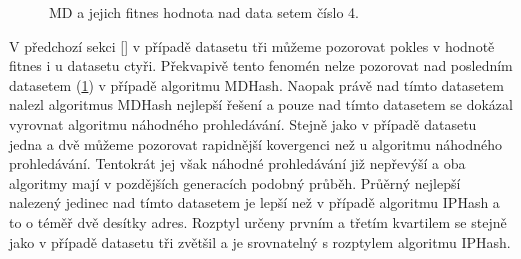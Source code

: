 \begin{figure}[!ht]
	\centering
	\caption{MD a jejich fitnes hodnota nad data setem číslo 4.}
	\label{fig:MDComparison4}
\end{figure}

V předchozí sekci [] v případě datasetu tři můžeme pozorovat pokles v hodnotě fitnes i u datasetu ctyři. Překvapivě
tento fenomén nelze pozorovat nad posledním datasetem (\ref{fig:MDComparison4}) v případě algoritmu MDHash. Naopak právě nad tímto datasetem
nalezl algoritmus MDHash nejlepší řešení a pouze nad tímto datasetem se dokázal vyrovnat algoritmu náhodného prohledávání.
Stejně jako v případě datasetu jedna a dvě můžeme pozorovat rapidnější kovergenci než u algoritmu náhodného prohledávání.
Tentokrát jej však náhodné prohledávání již nepřevýší a oba algoritmy mají v pozdějších generacích podobný průběh. Průěrný 
nejlepší nalezený jedinec nad tímto datasetem je lepší než v případě algoritmu IPHash a to o téměř dvě desítky adres. Rozptyl
určeny prvním a třetím kvartilem se stejně jako v případě datasetu tři zvětšil a je srovnatelný s rozptylem algoritmu IPHash.

